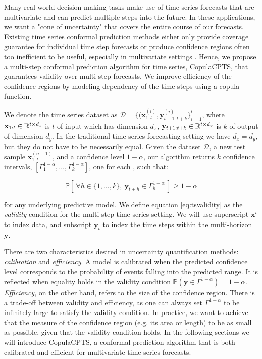 
Many real world decision making tasks make use of time series forecasts that are multivariate and can predict multiple steps into the future. In these applications, we want a "cone of uncertainty" that covers the entire course of our forecasts. Existing time series conformal prediction methods either only provide coverage guarantee for individual time step forecasts \cite{gibbs2021adaptive, xu2021conformal} or produce confidence regions often too inefficient to be useful, especially in multivariate settings  \cite{Schaar2021conformaltime}. Hence, we propose a multi-step conformal prediction algorithm for time series, CopulaCPTS, that guarantees validity over multi-step forecasts. We improve efficiency of the confidence regions by modeling dependency of the time steps using a copula function.

We denote the time series dataset as $\mathcal{D} = \{ (\mathbf{x}_{1:t}^{(i)}, \mathbf{y}_{t+1:t+k}^{(i)}\}_{i=1}^l$, where $\mathbf{x}_{1:t} \in \mathbb{R}^{t\times d_x} $ is $t$  of input which has dimension $d_x$, $\mathbf{y}_{t+1:t+k}  \in  \mathbb{R}^{t\times d_y}$ is $k$  of output of dimension $d_y$. In the traditional time series forecasting setting we have $d_x = d_y$, but they do not have to be necessarily equal. Given the dataset $\mathcal{D}$, a new test sample $\mathbf{x}_{1:t}^{(n+1)}$, and a confidence level $1-\alpha$, our algorithm returns $k$ confidence intervals, $[\Gamma^{1-\alpha}_1, \ldots, \Gamma^{1-\alpha}_k]$, one for each , such that:

\begin{equation}
    \mathbb{P}[\: \forall h \in \{1,\ldots, k\}, \: \mathbf{y}_{t+h} \in \Gamma^{1-\alpha}_h\: ] \geq 1-\alpha
\label{eq:tsvalidity}
\end{equation}

for any underlying predictive model. We define equation \ref{eq:tsvalidity} as the \textit{validity} condition for the multi-step time series setting. We will use superscript $\mathbf{x}^i$ to index data, and subscript $\mathbf{y}_t$ to index the time steps within the multi-horizon $\mathbf{y}$.

There are two characteristics desired in uncertainty quantification methods: \textit{calibration} and \textit{efficiency}. A model is calibrated when the predicted confidence level corresponds to the probability of events falling into the predicted range. It is reflected when equality holds in the validity condition $ \mathbb{P} (\mathbf{y} \in \Gamma^{1-\alpha})= 1-\alpha$. \textit{Efficiency}, on the other hand, refers to the size of the confidence region. There is a trade-off between validity and efficiency, as one can always set $\Gamma^{1-\alpha}$ to be infinitely large to satisfy the validity condition. In practice, we want to achieve that the measure of the confidence region (e.g. its area or length) to be as small as possible, given that the validity condition holds. In the following sections we will introduce CopulaCPTS, a conformal prediction algorithm that is both calibrated and efficient for multivariate time series forecasts. 

